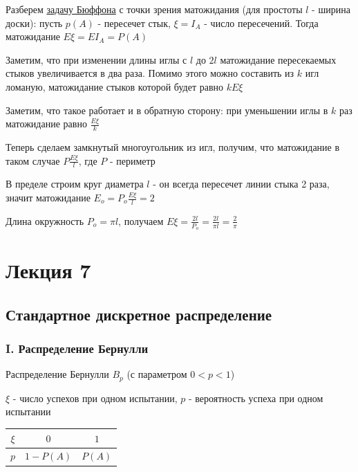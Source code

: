 \documentclass[12pt]{article}
\begin{document}
    \Ex Разберем \hyperlink{buffonsproblem}{задачу Бюффона} с точки зрения матожидания (для простоты $l$ - ширина доски): пусть $p(A)$ - пересечет стык,
    $\xi = I_A$ - число пересечений. Тогда матожидание $E\xi = E I_A = P(A)$

    Заметим, что при изменении длины иглы с $l$ до $2l$ матожидание пересекаемых стыков увеличивается
    в два раза. Помимо этого можно составить из $k$ игл ломаную, матожидание стыков которой будет равно $kE\xi$

    Заметим, что такое работает и в обратную сторону: при уменьшении иглы в $k$ раз матожидание равно $\frac{E\xi}{k}$

    Теперь сделаем замкнутый многоугольник из игл, получим, что матожидание в таком случае $P\frac{E\xi}{l}$, где $P$ - периметр

    В пределе строим круг диаметра $l$ - он всегда пересечет линии стыка 2 раза, значит матожидание $E_o = P_o\frac{E\xi}{l} = 2$

    Длина окружность $P_o = \pi l$, получаем $E\xi = \frac{2l}{P_o} = \frac{2l}{\pi l} = \frac{2}{\pi}$


    \section{Лекция 7}

    \subsection{Стандартное дискретное распределение}

    \subsubsection{I. Распределение Бернулли}

    Распределение Бернулли $B_p$ (с параметром $0 < p < 1$)

    $\xi$ - число успехов при одном испытании, $p$ - вероятность успеха при одном испытании
    
    \smallvspace

    \begin{tabular}{c|c|c}
        $\xi$ & $0$        & $1$    \\
        \hline
        $p$   & $1 - P(A)$ & $P(A)$
    \end{tabular}

    \smallvspace
\end{document}
